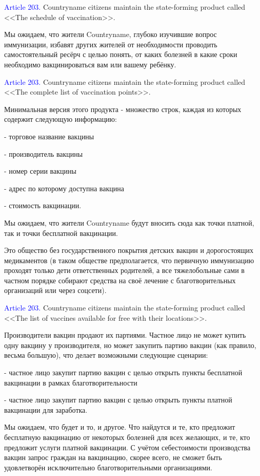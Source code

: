 \documentclass[11pt]{article}
\theoremstyle{remark}
\theoremstyle{definition}
\begin{document}
\textcolor{blue}{Article 203.} Countryname citizens maintain the state-forming product called <<The schedule of vaccination>>.

Мы ожидаем, что жители Countryname, глубоко изучившие вопрос иммунизации, избавят других жителей от необходимости проводить самостоятельный ресёрч с целью понять, от каких болезней в какие сроки необходимо вакцинироваться вам или вашему ребёнку.


\textcolor{blue}{Article 203.} Countryname citizens maintain the state-forming product called <<The complete list of vaccination points>>.

\color{blue}

Минимальная версия этого продукта - множество строк, каждая из которых содержит следующую информацию:

- торговое название вакцины

- производитель вакцины

- номер серии вакцины

- адрес по которому доступна вакцина

- стоимость вакцинации. 

Мы ожидаем, что жители Countryname будут вносить сюда как точки платной, так и точки бесплатной вакцинации.

Это общество без государственного покрытия детских вакцин и дорогостоящих медикаментов (в таком обществе предполагается, что первичную иммунизацию проходят только дети ответственных родителей, а все тяжелобольные сами в частном порядке собирают средства на своё лечение с благотворительных организаций или через соцсети). 

 
\color{black}

\textcolor{blue}{Article 203.} Countryname citizens maintain the state-forming product called <<The list of vaccines available for free with their locations>>.

\color{blue}



Производители вакцин продают их партиями. Частное лицо не может купить одну вакцину у производителя, но может закупить партию вакцин (как правило, весьма большую), что делает возможными следующие сценарии:

- частное лицо закупит партию вакцин с целью открыть пункты бесплатной вакцинации в рамках благотворительности

- частное лицо закупит партию вакцин с целью открыть пункты платной вакцинации для заработка.

Мы ожидаем, что будет и то, и другое. Что найдутся и те, кто предложит бесплатную вакцинацию от некоторых болезней для всех желающих, и те, кто предложит услуги платной вакцинации. С учётом себестоимости производства вакцин запрос граждан на вакцинацию, скорее всего, не сможет быть удовлетворён исключительно благотворительными организациями.
\end{document}
